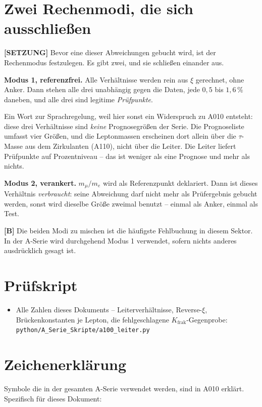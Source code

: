 \section{Zwei Rechenmodi, die sich ausschließen}

\textbf{[SETZUNG]} Bevor eine dieser Abweichungen gebucht wird, ist der
Rechenmodus festzulegen. Es gibt zwei, und sie schließen einander aus.

\textbf{Modus 1, referenzfrei.} Alle Verhältnisse werden rein aus $\xi$
gerechnet, ohne Anker. Dann stehen alle drei unabhängig gegen die Daten, jede
$0{,}5$ bis $1{,}6\,\%$ daneben, und alle drei sind legitime \emph{Prüfpunkte}.

Ein Wort zur Sprachregelung, weil hier sonst ein Widerspruch zu A010 entsteht:
diese drei Verhältnisse sind \emph{keine} Prognosegrößen der Serie. Die
Prognoseliste umfasst vier Größen, und die Leptonmassen erscheinen dort allein
über die $\tau$-Masse aus dem Zirkulanten (A110), nicht über die Leiter. Die
Leiter liefert Prüfpunkte auf Prozentniveau -- das ist weniger als eine
Prognose und mehr als nichts.

\textbf{Modus 2, verankert.} $m_\mu/m_e$ wird als Referenzpunkt deklariert.
Dann ist dieses Verhältnis \emph{verbraucht}: seine Abweichung darf nicht mehr
als Prüfergebnis gebucht werden, sonst wird dieselbe Größe zweimal benutzt --
einmal als Anker, einmal als Test.

\textbf{[B]} Die beiden Modi zu mischen ist die häufigste Fehlbuchung in diesem
Sektor. In der A-Serie wird durchgehend Modus 1 verwendet, sofern nichts anderes
ausdrücklich gesagt ist.

\section{Prüfskript}

\begin{itemize}
  \item Alle Zahlen dieses Dokuments -- Leiterverhältnisse, Reverse-$\xi$,
    Brückenkonstanten je Lepton, die fehlgeschlagene
    $K_\text{frak}$-Gegenprobe:
    \texttt{python/A\_Serie\_Skripte/a100\_leiter.py}
\end{itemize}


\section{Zeichenerklärung}

Symbole die in der gesamten A-Serie verwendet werden, sind in A010 erklärt.
Spezifisch für dieses Dokument:

